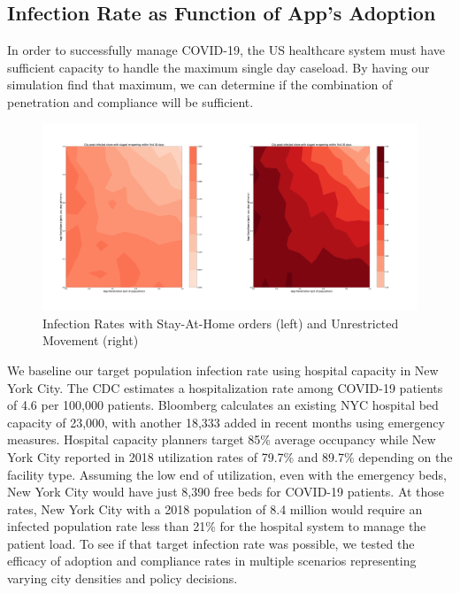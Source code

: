 \documentclass{article}
\begin{document}
\subsection{Infection Rate as Function of App's Adoption}

In order to successfully manage COVID-19, the US healthcare system must have sufficient capacity to handle the maximum single day caseload. By having our simulation find that maximum, we can determine if the combination of penetration and compliance will be sufficient.

\begin{figure} %
  \centering
  \includegraphics[scale=0.15]{Figure-1.png}
  \caption{ Infection Rates with Stay-At-Home orders (left) and Unrestricted Movement (right)}
  \label{fig:fig1}
\end{figure}

We baseline our target population infection rate using hospital capacity in New York City. The CDC estimates a hospitalization rate among COVID-19 patients of 4.6 per 100,000 patients\cite{PatientCharCDC}. Bloomberg calculates an existing NYC hospital bed capacity of 23,000, with another 18,333 added in recent months using emergency measures\cite{HospitalBedsNYC}. Hospital capacity planners target 85\% average occupancy\cite{HowManyBeds}  while New York City reported in 2018 utilization rates of 79.7\% and 89.7\% depending on the facility type\cite{BedUtilizationReport}. Assuming the low end of utilization, even with the emergency beds, New York City would have just 8,390 free beds for COVID-19 patients. At those rates, New York City with a 2018 population of 8.4 million would require an infected population rate less than 21\% for the hospital system to manage the patient load. To see if that target infection rate was possible, we tested the efficacy of adoption and compliance rates in multiple scenarios representing varying city densities and policy decisions.
\end{document}
